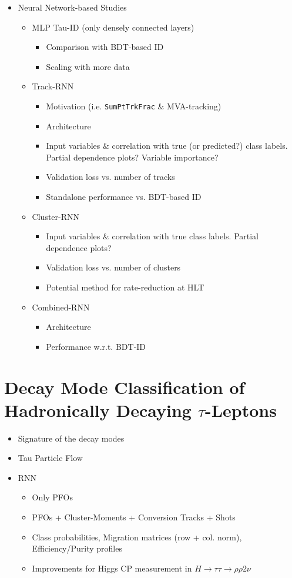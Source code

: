 \begin{itemize}
\item Neural Network-based Studies
  \begin{itemize}
  \item MLP Tau-ID (only densely connected layers)
    \begin{itemize}
    \item Comparison with BDT-based ID
    \item Scaling with more data
    \end{itemize}
  \item Track-RNN
    \begin{itemize}
    \item Motivation (i.e. \texttt{SumPtTrkFrac} \& MVA-tracking)
    \item Architecture
    \item Input variables \& correlation with true (or predicted?) class labels.
      Partial dependence plots? Variable importance?
    \item Validation loss vs. number of tracks
    \item Standalone performance vs. BDT-based ID
    \end{itemize}
  \item Cluster-RNN
    \begin{itemize}
    \item Input variables \& correlation with true class labels. Partial
      dependence plots?
    \item Validation loss vs. number of clusters
    \item Potential method for rate-reduction at HLT
    \end{itemize}
  \item Combined-RNN
    \begin{itemize}
    \item Architecture
    \item Performance w.r.t. BDT-ID
    \end{itemize}
  \end{itemize}
\end{itemize}

\section{Decay Mode Classification of Hadronically Decaying $\tau$-Leptons}

\begin{itemize}
\item Signature of the decay modes
\item Tau Particle Flow
\item RNN
  \begin{itemize}
  \item Only PFOs
  \item PFOs + Cluster-Moments + Conversion Tracks + Shots
  \item Class probabilities, Migration matrices (row + col. norm),
    Efficiency/Purity profiles
  \item Improvements for Higgs CP measurement in
    $H \rightarrow \tau\tau \rightarrow \rho \rho 2\nu$
  \end{itemize}
\end{itemize}

